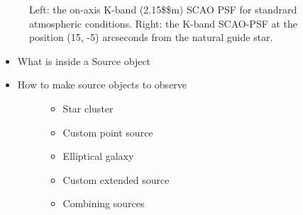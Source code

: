 \begin{figure}[H]
\noindent{}\label{fig-scopesim-templates-cluster-example}

\caption{Left: the on-axis K-band (2.15\$\mu\$m) SCAO PSF for standrard atmospheric conditions.
Right: the K-band SCAO-PSF at the position (15, -5) arcseconds from the natural guide star.}
\end{figure}

\begin{itemize}
\item What is inside a Source object

\item 
\begin{description}
\item[{How to make source objects to observe}] \leavevmode 
\begin{itemize}
\item Star cluster

\item Custom point source

\item Elliptical galaxy

\item Custom extended source

\item Combining sources
\end{itemize}

\end{description}
\end{itemize}

